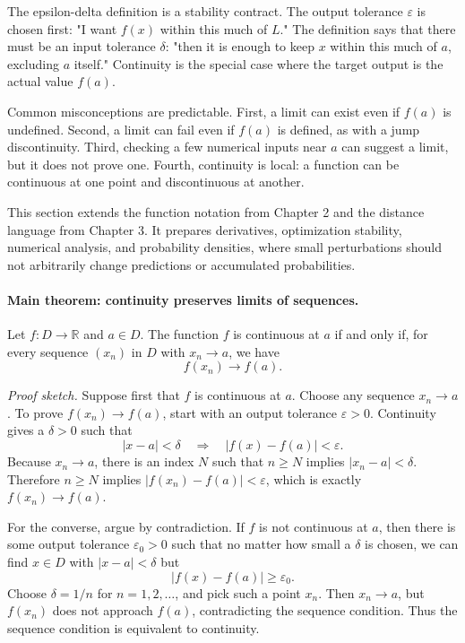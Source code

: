 The epsilon-delta definition is a stability contract. The output tolerance \(\varepsilon\) is chosen first: "I want \(f(x)\) within this much of \(L\)." The definition says that there must be an input tolerance \(\delta\): "then it is enough to keep \(x\) within this much of \(a\), excluding \(a\) itself." Continuity is the special case where the target output is the actual value \(f(a)\).

Common misconceptions are predictable. First, a limit can exist even if \(f(a)\) is undefined. Second, a limit can fail even if \(f(a)\) is defined, as with a jump discontinuity. Third, checking a few numerical inputs near \(a\) can suggest a limit, but it does not prove one. Fourth, continuity is local: a function can be continuous at one point and discontinuous at another.

This section extends the function notation from Chapter 2 and the distance language from Chapter 3. It prepares derivatives, optimization stability, numerical analysis, and probability densities, where small perturbations should not arbitrarily change predictions or accumulated probabilities.

\paragraph{Main theorem: continuity preserves limits of sequences.}
Let \(f:D\to\mathbb{R}\) and \(a\in D\). The function \(f\) is continuous at \(a\) if and only if, for every sequence \((x_n)\) in \(D\) with \(x_n\to a\), we have
\[
f(x_n)\to f(a).
\]

\emph{Proof sketch.} Suppose first that \(f\) is continuous at \(a\). Choose any sequence \(x_n\to a\). To prove \(f(x_n)\to f(a)\), start with an output tolerance \(\varepsilon>0\). Continuity gives a \(\delta>0\) such that
\[
|x-a|<\delta \quad\Longrightarrow\quad |f(x)-f(a)|<\varepsilon.
\]
Because \(x_n\to a\), there is an index \(N\) such that \(n\geq N\) implies \(|x_n-a|<\delta\). Therefore \(n\geq N\) implies \(|f(x_n)-f(a)|<\varepsilon\), which is exactly \(f(x_n)\to f(a)\).

For the converse, argue by contradiction. If \(f\) is not continuous at \(a\), then there is some output tolerance \(\varepsilon_0>0\) such that no matter how small a \(\delta\) is chosen, we can find \(x\in D\) with \(|x-a|<\delta\) but
\[
|f(x)-f(a)|\geq \varepsilon_0.
\]
Choose \(\delta=1/n\) for \(n=1,2,\dots\), and pick such a point \(x_n\). Then \(x_n\to a\), but \(f(x_n)\) does not approach \(f(a)\), contradicting the sequence condition. Thus the sequence condition is equivalent to continuity.

